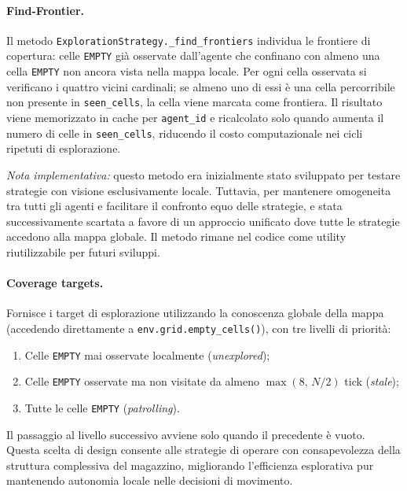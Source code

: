 \paragraph{Find-Frontier.}
Il metodo \texttt{ExplorationStrategy.\_find\_frontiers} individua le frontiere di
copertura: celle \texttt{EMPTY} gi\`a osservate dall'agente che confinano con almeno
una cella \texttt{EMPTY} non ancora vista nella mappa locale. Per ogni cella osservata
si verificano i quattro vicini cardinali; se almeno uno di essi \`e una cella
percorribile non presente in \texttt{seen\_cells}, la cella viene marcata come
frontiera. Il risultato viene memorizzato in cache per \texttt{agent\_id} e ricalcolato
solo quando aumenta il numero di celle in \texttt{seen\_cells}, riducendo il costo
computazionale nei cicli ripetuti di esplorazione.

\textit{Nota implementativa:} questo metodo era inizialmente stato sviluppato per testare
strategie con visione esclusivamente locale. Tuttavia, per mantenere omogeneita tra
tutti gli agenti e facilitare il confronto equo delle strategie, e stata successivamente
scartata a favore di un approccio unificato dove tutte le strategie accedono alla mappa
globale. Il metodo rimane nel codice come utility riutilizzabile per futuri sviluppi.

\paragraph{Coverage targets.}
Fornisce i target di esplorazione utilizzando la conoscenza globale della mappa
(accedendo direttamente a \texttt{env.grid.empty\_cells()}), con tre livelli di priorit\`a:
\begin{enumerate}
  \item Celle \texttt{EMPTY} mai osservate localmente (\textit{unexplored});
  \item Celle \texttt{EMPTY} osservate ma non visitate da almeno $\max(8,\,N/2)$ tick
        (\textit{stale});
  \item Tutte le celle \texttt{EMPTY} (\textit{patrolling}).
\end{enumerate}
Il passaggio al livello successivo avviene solo quando il precedente \`e vuoto. Questa
scelta di design consente alle strategie di operare con consapevolezza della struttura
complessiva del magazzino, migliorando l'efficienza esplorativa pur mantenendo autonomia
locale nelle decisioni di movimento.


